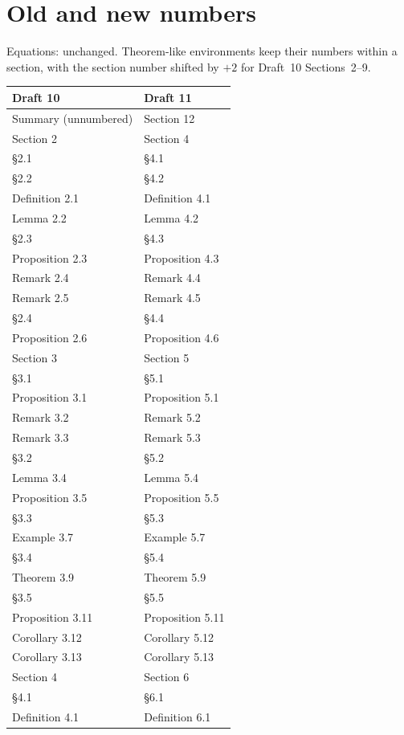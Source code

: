 \documentclass[11pt]{article}
\begin{document}
\section*{Old and new numbers}
Equations: unchanged.  Theorem-like environments keep their numbers
within a section, with the section number shifted by $+2$ for Draft~10
Sections~2--9.

\begin{center}\footnotesize
\begin{tabular}[t]{@{}ll@{}}\toprule Draft 10 & Draft 11\\\midrule
Summary (unnumbered) & Section 12\\
Section 2 & Section 4\\
\S2.1 & \S4.1\\
\S2.2 & \S4.2\\
Definition 2.1 & Definition 4.1\\
Lemma 2.2 & Lemma 4.2\\
\S2.3 & \S4.3\\
Proposition 2.3 & Proposition 4.3\\
Remark 2.4 & Remark 4.4\\
Remark 2.5 & Remark 4.5\\
\S2.4 & \S4.4\\
Proposition 2.6 & Proposition 4.6\\
Section 3 & Section 5\\
\S3.1 & \S5.1\\
Proposition 3.1 & Proposition 5.1\\
Remark 3.2 & Remark 5.2\\
Remark 3.3 & Remark 5.3\\
\S3.2 & \S5.2\\
Lemma 3.4 & Lemma 5.4\\
Proposition 3.5 & Proposition 5.5\\
\S3.3 & \S5.3\\
Example 3.7 & Example 5.7\\
\S3.4 & \S5.4\\
Theorem 3.9 & Theorem 5.9\\
\S3.5 & \S5.5\\
Proposition 3.11 & Proposition 5.11\\
Corollary 3.12 & Corollary 5.12\\
Corollary 3.13 & Corollary 5.13\\
Section 4 & Section 6\\
\S4.1 & \S6.1\\
Definition 4.1 & Definition 6.1\\

\end{tabular}
\end{center}
\end{document}
